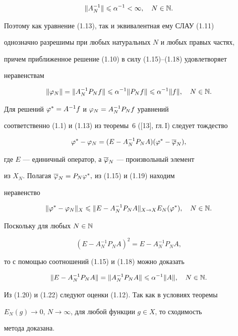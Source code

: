 \begin{pf}
\begin{equation}


\|A_N^{-1}\|\lea \alpha^{-1}<\infty,\quad N\in\N.


\end{equation}


Поэтому как уравнение (1.13), так и эквивалентная ему СЛАУ (1.11) 


однозначно разрешимы при любых натуральных $N$ и любых правых частях, 


причем приближенное решение (1.10) в силу (1.15)--(1.18) удовлетворяет


неравенствам


$$


\|\vp_N\| = \|A_N^{-1}P_N f\|\lea \alpha^{-1}\|P_N f\|\lea \alpha^{-1}\|f\|,


\quad N\in \N.


$$





Для решений $\varphi^* = A^{-1}f$ и $\varphi _N = A^{-1}_NP_N f$ уравнений 


соответственно (1.1) и (1.13) из теоремы~6 ([13], гл.\,I) следует тождество


\begin{equation}


\vp^* - \vp_N = (E-A_N^{-1}P_N A)(\vp^* - \ol{\vp}_N),


\end{equation}


где $E$ --- единичный оператор, а $\overline{\varphi}_N$ --- произвольный элемент 


из $X_N$. Полагая $\overline{\varphi}_N = P_N \varphi^*,$ из (1.15) и (1.19) находим 


неравенство 


\begin{equation}


\|\vp^* - \vp_N\|_X \lea \|E - A_N^{-1}P_N A\|_{X\to X} E_N(\vp ^*),


\quad N\in \N.


\end{equation}


Поскольку для любых $N\in \Bbb N$


\begin{equation}


(E - A_N^{-1}P_NA)^2 = E-A_N^{-1}P_NA,


\end{equation}


то с помощью соотношений (1.15) и (1.18) можно доказать


\begin{equation}


\|E - A_N^{-1}P_NA\| = \|A_N^{-1}P_NA\| \lea \alpha^{-1}\|A\|,\quad


N \in\N.


\end{equation}


Из (1.20) и (1.22) следуют оценки (1.12). Так как в условиях теоремы 


$E_N(g)\to 0$, $N\to \infty$, для любой функции $g\in X$, то сходимость 


метода доказана.


\end{pf}
